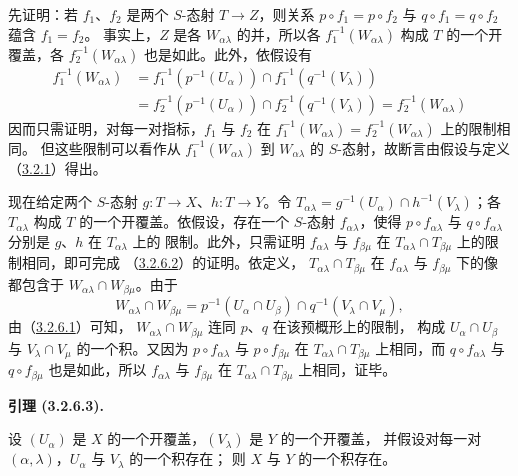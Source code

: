\documentclass[UTF8,fontset=none,11pt,oneside,openany]{ctexbook}
\newenvironment{lemma}[1][]{%
  \par\medskip\noindent\textbf{引理 (#1).}\ %
}{\par}
\newcommand{\oldpage}[2][]{%
  \hypertarget{ega-source-page-#1-#2}{}%
  \marginnote{\scriptsize\textbf{#1}~|~#2}\ignorespaces}
\let\EGAOriginalLabel\label
\renewcommand{\label}[1]{\phantomsection\EGAOriginalLabel{#1}}
\begin{document}
先证明：若 $f_1$、$f_2$ 是两个 $S$-态射 $T\to Z$，则关系
$p\circ f_1=p\circ f_2$ 与 $q\circ f_1=q\circ f_2$ 蕴含 $f_1=f_2$。
事实上，$Z$ 是各 $W_{\alpha\lambda}$ 的并，所以各
$f_1^{-1}(W_{\alpha\lambda})$ 构成 $T$ 的一个开覆盖，各
$f_2^{-1}(W_{\alpha\lambda})$ 也是如此。此外，依假设有
\[
\begin{aligned}
  f_1^{-1}(W_{\alpha\lambda})
  &=f_1^{-1}(p^{-1}(U_\alpha))\cap
    f_1^{-1}(q^{-1}(V_\lambda)) \\
  &=f_2^{-1}(p^{-1}(U_\alpha))\cap
    f_2^{-1}(q^{-1}(V_\lambda))
   =f_2^{-1}(W_{\alpha\lambda})
\end{aligned}
\]
因而只需证明，对每一对指标，$f_1$ 与 $f_2$ 在
$f_1^{-1}(W_{\alpha\lambda})=f_2^{-1}(W_{\alpha\lambda})$ 上的限制相同。
但这些限制可以看作从 $f_1^{-1}(W_{\alpha\lambda})$ 到
$W_{\alpha\lambda}$ 的 $S$-态射，故断言由假设与定义
（\hyperref[I.3.2.1-fr]{3.2.1}）得出。

现在给定两个 $S$-态射 $g:T\to X$、$h:T\to Y$。令
$T_{\alpha\lambda}=g^{-1}(U_\alpha)\cap h^{-1}(V_\lambda)$；各
$T_{\alpha\lambda}$ 构成 $T$ 的一个开覆盖。依假设，存在一个 $S$-态射
$f_{\alpha\lambda}$，使得 $p\circ f_{\alpha\lambda}$ 与
$q\circ f_{\alpha\lambda}$ 分别是 $g$、$h$ 在 $T_{\alpha\lambda}$ 上的
限制。此外，只需证明 $f_{\alpha\lambda}$ 与 $f_{\beta\mu}$ 在
$T_{\alpha\lambda}\cap T_{\beta\mu}$ 上的限制相同，即可完成
（\hyperref[I.3.2.6.2-fr]{3.2.6.2}）的证明。依定义，
$T_{\alpha\lambda}\cap T_{\beta\mu}$ 在 $f_{\alpha\lambda}$ 与
$f_{\beta\mu}$ 下的像都包含于
$W_{\alpha\lambda}\cap W_{\beta\mu}$。由于
\[
  W_{\alpha\lambda}\cap W_{\beta\mu}
  =p^{-1}(U_\alpha\cap U_\beta)\cap
   q^{-1}(V_\lambda\cap V_\mu),
\]
由（\hyperref[I.3.2.6.1-fr]{3.2.6.1}）可知，
$W_{\alpha\lambda}\cap W_{\beta\mu}$ 连同 $p$、$q$ 在该预概形上的限制，
构成 $U_\alpha\cap U_\beta$ 与 $V_\lambda\cap V_\mu$ 的一个积。又因为
$p\circ f_{\alpha\lambda}$ 与 $p\circ f_{\beta\mu}$ 在
$T_{\alpha\lambda}\cap T_{\beta\mu}$ 上相同，而
$q\circ f_{\alpha\lambda}$ 与 $q\circ f_{\beta\mu}$ 也是如此，所以
$f_{\alpha\lambda}$ 与 $f_{\beta\mu}$ 在
$T_{\alpha\lambda}\cap T_{\beta\mu}$ 上相同，证毕。

\oldpage[I]{107}
\begin{lemma}[3.2.6.3]
\label{I.3.2.6.3-fr}
设 $(U_\alpha)$ 是 $X$ 的一个开覆盖，$(V_\lambda)$ 是 $Y$ 的一个开覆盖，
并假设对每一对 $(\alpha,\lambda)$，$U_\alpha$ 与 $V_\lambda$ 的一个积存在；
则 $X$ 与 $Y$ 的一个积存在。
\end{lemma}
\end{document}
